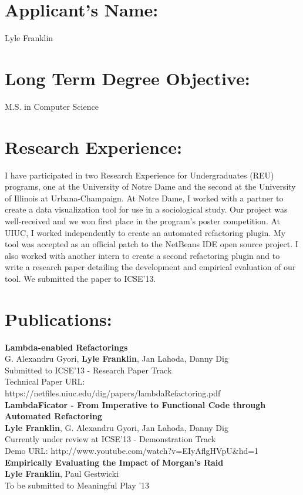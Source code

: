 \documentclass[11pt]{article}
\begin{document}
\section{Applicant's Name:}
Lyle Franklin

\section{Long Term Degree Objective:}
M.S. in Computer Science

\section{Research Experience:}
I have participated in two Research Experience for Undergraduates (REU) programs, one at the University of Notre Dame and the second at the University of Illinois at Urbana-Champaign. At Notre Dame, I worked with a partner to create a data visualization tool for use in a sociological study. Our project was well-received and we won first place in the program's poster competition. At UIUC, I worked independently to create an automated refactoring plugin. My tool was accepted as an official patch to the NetBeans IDE open source project. I also worked with another intern to create a second refactoring plugin and to write a research paper detailing the development and empirical evaluation of our tool. We submitted the paper to ICSE'13.

\section{Publications:}
\textbf{Lambda-enabled Refactorings} \\
G. Alexandru Gyori, \textbf{Lyle Franklin}, Jan Lahoda, Danny Dig \\
Submitted to ICSE'13 - Research Paper Track \\
Technical Paper URL: https://netfiles.uiuc.edu/dig/papers/lambdaRefactoring.pdf \\

\noindent \textbf{LambdaFicator - From Imperative to Functional Code through Automated Refactoring} \\
\textbf{Lyle Franklin}, G. Alexandru Gyori, Jan Lahoda, Danny Dig \\
Currently under review at ICSE'13 - Demonstration Track \\
Demo URL: http://www.youtube.com/watch?v=EIyAflgHVpU\&hd=1 \\

\noindent \textbf{Empirically Evaluating the Impact of Morgan's Raid} \\
\textbf{Lyle Franklin}, Paul Gestwicki \\
To be submitted to Meaningful Play '13 \\
\end{document}
